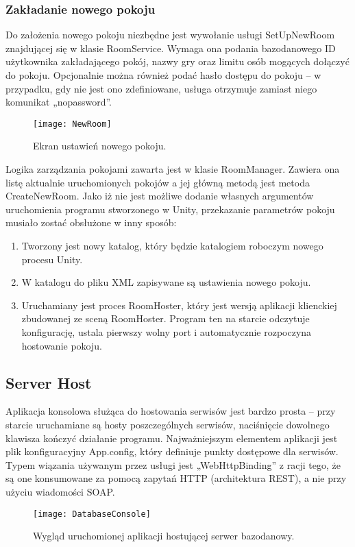 \subsubsection{Zakładanie nowego pokoju}
Do założenia nowego pokoju niezbędne jest wywołanie usługi SetUpNewRoom znajdującej się w klasie RoomService. Wymaga ona podania bazodanowego ID użytkownika zakładającego pokój, nazwy gry oraz limitu osób mogących dołączyć do pokoju. Opcjonalnie można również podać hasło dostępu do pokoju – w przypadku, gdy nie jest ono zdefiniowane, usługa otrzymuje zamiast niego komunikat „nopassword”.

\begin{figure}[htbp]
\centering
\texttt{[image: NewRoom]}
\caption{Ekran ustawień nowego pokoju.}
\label{fig:newroom}
\end{figure}

Logika zarządzania pokojami zawarta jest w klasie RoomManager. Zawiera ona listę aktualnie uruchomionych pokojów a jej główną metodą jest metoda CreateNewRoom. Jako iż nie jest możliwe dodanie własnych argumentów uruchomienia programu stworzonego w Unity, przekazanie parametrów pokoju musiało zostać obsłużone w inny sposób:
\begin{enumerate}
\item Tworzony jest nowy katalog, który będzie katalogiem roboczym nowego procesu Unity.
\item W katalogu do pliku XML zapisywane są ustawienia nowego pokoju.
\item Uruchamiany jest proces RoomHoster, który jest wersją aplikacji klienckiej zbudowanej ze sceną RoomHoster. Program ten na starcie odczytuje konfigurację, ustala pierwszy wolny port i automatycznie rozpoczyna hostowanie pokoju.
\end{enumerate}

\subsection{Server Host}
Aplikacja konsolowa służąca do hostowania serwisów jest bardzo prosta – przy starcie uruchamiane są hosty poszczególnych serwisów, naciśnięcie dowolnego klawisza kończyć działanie programu. Najważniejszym elementem aplikacji jest plik konfiguracyjny App.config, który definiuje punkty dostępowe dla serwisów. Typem wiązania używanym przez usługi jest „WebHttpBinding” z racji tego, że są one konsumowane za pomocą zapytań HTTP (architektura REST), a nie przy użyciu wiadomości SOAP.

\begin{figure}[htbp]
\centering
\texttt{[image: DatabaseConsole]}
\caption{Wygląd uruchomionej aplikacji hostującej serwer bazodanowy.}
\label{fig:databaseconsole}
\end{figure}